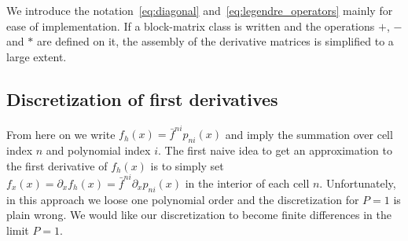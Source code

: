 We introduce the notation~\eqref{eq:diagonal} and~\eqref{eq:legendre_operators} mainly for ease of implementation. If a block-matrix class is written and the
operations $+$, $-$ and $*$ are defined on it, the assembly of the derivative
matrices is simplified to a large extent. 

%



\subsection{ Discretization of first derivatives} \label{sec:firstderivatives}
From here on we write
$ f_h(x) = \bar f^{ni}p_{ni}(x)$ and imply the summation over cell index $n$ and polynomial
index $i$.
The first naive idea to get an approximation to the first derivative of $f_h(x)$
is to simply set $f_x(x) = \partial_x f_h(x) = \bar f^{ni}\partial_x p_{ni}(x)$ in 
the interior of each cell $n$. 
Unfortunately, in this approach we loose one polynomial order and the discretization for
$P=1$ is plain wrong. We would 
like our discretization to become finite differences in the limit $P=1$.

